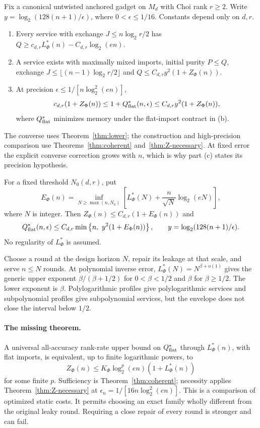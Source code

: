 \begin{theorem}\label{thm:main}
Fix a canonical untwisted anchored gadget on $M_d$ with Choi rank
$r\geq2$. Write $y=\log_2(128(n+1)/\epsilon)$, where
$0<\epsilon\leq1/16$. Constants depend only on $d,r$.
\begin{enumerate}[label=(\alph*),itemsep=2pt]
\item Every service with exchange $J\leq n\log_2r/2$ has
$Q\geq c_{d,r}L^*_\Phi(n)-C_{d,r}\log_2(en)$.
\item A service exists with maximally mixed imports, initial purity
$P\leq Q$, exchange $J\leq\lfloor(n-1)\log_2r/2\rfloor$ and
$Q\leq C_{d,r}y^2(1+Z_\Phi(n))$.
\item At precision $\epsilon\leq1/[n\log_2^2(en)]$,
\[
 c_{d,r}(1+Z_\Phi(n))\leq1+Q^{*}_{\rm flat}(n,\epsilon)
       \leq C_{d,r}y^2(1+Z_\Phi(n)),
\]
where $Q^{*}_{\rm flat}$ minimizes memory under the flat-import contract in (b).
\end{enumerate}
\end{theorem}

The converse uses Theorem~\ref{thm:lower}; the construction and high-precision
comparison use Theorems~\ref{thm:coherent} and~\ref{thm:Z-necessary}.
At fixed error the explicit converse correction grows with $n$, which
is why part (c) states its precision hypothesis.

\begin{theorem}\label{thm:envelope}
For a fixed threshold $N_0(d,r)$, put
\[
 E_\Phi(n)=\inf_{N\ge\max(n,N_0)}
 \left[L^*_\Phi(N)+\frac n{\sqrt N}\log_2(eN)\right],
\]
where $N$ is integer. Then $Z_\Phi(n)\le C_{d,r}(1+E_\Phi(n))$ and
\[
 Q^{*}_{\rm flat}(n,\epsilon)\le C_{d,r}\min\left\{n,\ y^2(1+E_\Phi(n))\right\},
 \qquad y=\log_2(128(n+1)/\epsilon).
\]
No regularity of $L^*_\Phi$ is assumed.
\end{theorem}

Choose a round at the design horizon $N$, repair its leakage at that scale, and serve $n\le N$ rounds.
At polynomial inverse error, $L^*_\Phi(N)=N^{\beta+o(1)}$ gives the generic upper exponent
$\beta/(\beta+1/2)$ for $0<\beta<1/2$ and $\beta$ for $\beta\ge1/2$.
The lower exponent is $\beta$. Polylogarithmic profiles give polylogarithmic services and subpolynomial
profiles give subpolynomial services, but the envelope does not close the interval below $1/2$.

\paragraph{The missing theorem.}
A universal all-accuracy rank-rate upper bound on $Q^{*}_{\rm flat}$ through $L^*_\Phi(n)$, with flat imports, is equivalent, up to finite
logarithmic powers, to
\begin{equation}\label{eq:missing-comparison}
 Z_\Phi(n)\le K_\Phi\log_2^p(en)(1+L^*_\Phi(n))
\end{equation}
for some finite $p$. Sufficiency is Theorem~\ref{thm:coherent}; necessity applies
Theorem~\ref{thm:Z-necessary} at $\epsilon_n=1/[16n\log_2^2(en)]$.
This is a comparison of optimized static costs. It permits choosing an exact family wholly different from
the original leaky round. Requiring a close repair of every round is stronger and can fail.

